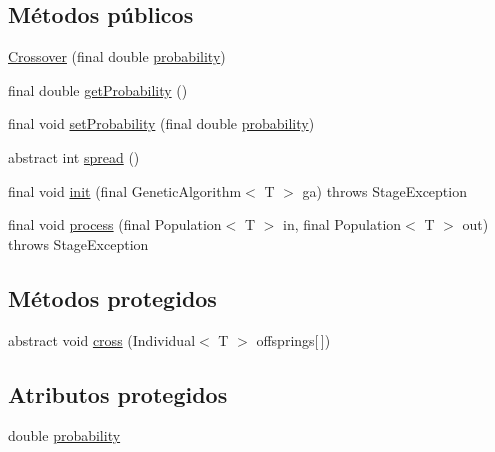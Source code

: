 \subsection*{Métodos públicos}
\begin{DoxyCompactItemize}
\item 
\hyperlink{classjenes_1_1stage_1_1operator_1_1_crossover_3_01_t_01extends_01_chromosome_01_4_a2287f5646b08b9c3167934ee620f2d6e}{Crossover} (final double \hyperlink{classjenes_1_1stage_1_1operator_1_1_crossover_3_01_t_01extends_01_chromosome_01_4_a2b4aec7312a223ba84862f7848b14542}{probability})
\item 
final double \hyperlink{classjenes_1_1stage_1_1operator_1_1_crossover_3_01_t_01extends_01_chromosome_01_4_a86b60220061c4bf1f0eaae66d22f5eb8}{get\-Probability} ()
\item 
final void \hyperlink{classjenes_1_1stage_1_1operator_1_1_crossover_3_01_t_01extends_01_chromosome_01_4_ac491f1c3b3b8c074f3b59bc33f65f389}{set\-Probability} (final double \hyperlink{classjenes_1_1stage_1_1operator_1_1_crossover_3_01_t_01extends_01_chromosome_01_4_a2b4aec7312a223ba84862f7848b14542}{probability})
\item 
abstract int \hyperlink{classjenes_1_1stage_1_1operator_1_1_crossover_3_01_t_01extends_01_chromosome_01_4_a8bb995f2cf77073b79c9276ee3e8535d}{spread} ()
\item 
final void \hyperlink{classjenes_1_1stage_1_1operator_1_1_crossover_3_01_t_01extends_01_chromosome_01_4_ac0b5d0219d2938f7756e616d04039ae0}{init} (final Genetic\-Algorithm$<$ T $>$ ga)  throws Stage\-Exception 
\item 
final void \hyperlink{classjenes_1_1stage_1_1operator_1_1_crossover_3_01_t_01extends_01_chromosome_01_4_ac14c88e86762023813c69bee4c31d7ea}{process} (final Population$<$ T $>$ in, final Population$<$ T $>$ out)  throws Stage\-Exception 
\end{DoxyCompactItemize}
\subsection*{Métodos protegidos}
\begin{DoxyCompactItemize}
\item 
abstract void \hyperlink{classjenes_1_1stage_1_1operator_1_1_crossover_3_01_t_01extends_01_chromosome_01_4_ac47e22fb5a73617bde7a1131da5be161}{cross} (Individual$<$ T $>$ offsprings\mbox{[}$\,$\mbox{]})
\end{DoxyCompactItemize}
\subsection*{Atributos protegidos}
\begin{DoxyCompactItemize}
\item 
double \hyperlink{classjenes_1_1stage_1_1operator_1_1_crossover_3_01_t_01extends_01_chromosome_01_4_a2b4aec7312a223ba84862f7848b14542}{probability}
\end{DoxyCompactItemize}


